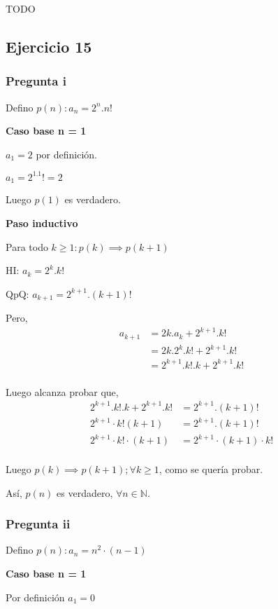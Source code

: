 TODO

\subsection{Ejercicio 15}

\subsubsection{Pregunta i}

Defino $ p(n): a_n = 2^n.n! $

\textbf{Caso base n = 1}

$ a_1 = 2 $ por definición. 

$ a_1 = 2^1.1! = 2 $

Luego $ p(1) $ es verdadero.

\textbf{Paso inductivo}

Para todo $k \geq 1: p(k) \implies p(k+1)$

HI: $ a_k = 2^k.k!$

QpQ: $ a_{k+1} = 2^{k+1}.(k+1)!$

Pero,
\begin{align*}
    a_{k+1} &= 2k . a_k + 2^{k+1}.k! \\
    &= 2k . 2^k.k! + 2^{k+1}.k! \\
    &= 2^{k+1}.k!.k + 2^{k+1}.k! \\
\end{align*}

Luego alcanza probar que,
\begin{align*}
    2^{k+1}.k!.k + 2^{k+1}.k! &= 2^{k+1}.(k+1)! \\
    2^{k+1}\cdot k!(k+1) &= 2^{k+1}.(k+1)! \\
    2^{k+1}\cdot k!\cdot (k+1) &= 2^{k+1}\cdot (k+1)\cdot k! \\
\end{align*}

Luego $p(k) \implies p(k+1); \forall k \geq 1$, como se quería probar.

Así, $p(n)$ es verdadero, $\forall n \in \mathbb{N}$.

\subsubsection{Pregunta ii}

Defino $ p(n): a_n = n^2\cdot (n-1) $

\textbf{Caso base n = 1}

Por definición $a_1 = 0$

